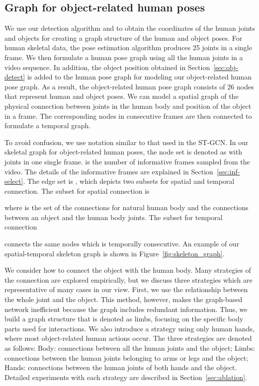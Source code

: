 \documentclass[10pt,twocolumn,letterpaper]{article}
\begin{document}
\subsection{Graph for object-related human poses}
\label{sec:graph-construct}
We use our detection algorithm and  to obtain the coordinates of the human joints and objects for creating a graph structure of the human and object poses.
For human skeletal data, the pose estimation algorithm produces 25 joints in a single frame.
We then formulate a human pose graph using all the human joints in a video sequence.
In addition, the object position obtained in Section~\ref{sec:obj-detect} is added to the human pose graph for modeling our object-related human pose graph.
As a result, the object-related human pose graph consists of 26 nodes that represent human and object poses.
We can model a spatial graph of the physical connection between joints in the human body and position of the object in a frame.
The corresponding nodes in consecutive frames are then connected to formulate a temporal graph.


To avoid confusion, we use notation similar to that used in the ST-GCN.
In our skeletal graph  for object-related human poses, the node set is denoted as  with  joints in one single frame. 
 is the number of informative frames sampled from the video.
The details of the informative frames are explained in Section~\ref{sec:inf-select}.
The edge set is , which depicts two subsets for spatial and temporal connection.
The subset for spatial connection is 

where  is the set of the connections for natural human body and the connections between an object and the human body joints.
The subset for temporal connection

connects the same nodes which is temporally consecutive.
An example of our spatial-temporal skeleton graph is shown in Figure~\ref{fig:skeleton_graph}.

We consider how to connect the object with the human body.
Many strategies of the connection are explored empirically, but we discuss three strategies which are representative of many cases in our view.
First, we use the relationship between the whole joint and the object.
This method, however, makes the graph-based network inefficient because the graph includes redundant information.
Thus, we build a graph structure that is denoted as limbs, focusing on the specific body parts used for interactions. 
We also introduce a strategy using only human hands, where most object-related human actions occur.
The three strategies are denoted as follows: 
 Body: connections between all the human joints and the object; 
 Limbs: connections between the human joints belonging to arms or legs and the object; 
 Hands: connections between the human joints of both hands and the object.
Detailed experiments with each strategy are described in Section~\ref{sec:ablation}.
\end{document}
